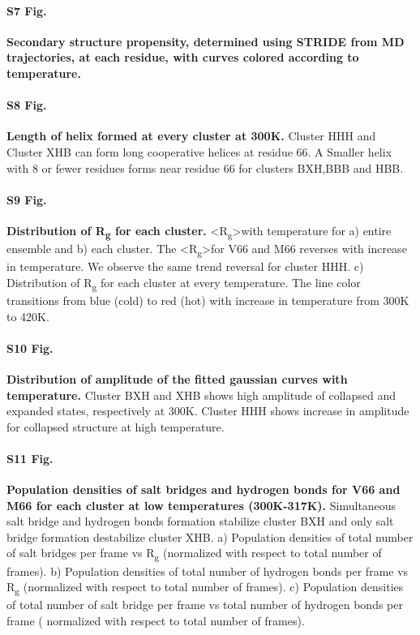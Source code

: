 \documentclass[10pt,letterpaper]{article}
\begin{document}
\paragraph*{S7 Fig.}
\label{S7_Fig} 
{\bf Secondary structure propensity, determined using STRIDE from MD trajectories, at each residue, with curves colored according to temperature.}

\paragraph*{S8 Fig.}
\label{S8_Fig} 
{\bf Length of helix formed at every cluster at 300K.} Cluster HHH and Cluster XHB can form long cooperative helices at residue 66. A Smaller helix with 8 or fewer residues forms near residue 66 for clusters BXH,BBB and HBB.
 
\paragraph*{S9 Fig.}
\label{S9_Fig} 
{\bf Distribution of R\textsubscript{g} for each cluster.}
\textless R\textsubscript{g}\textgreater with temperature for a) entire ensemble and b) each cluster. The \textless R\textsubscript{g}\textgreater for V66 and M66 reverses with increase in temperature. We observe the same trend reversal for cluster HHH. c) Distribution of R\textsubscript{g} for each cluster at every temperature. The line color transitions from blue (cold) to red (hot) with increase in temperature from 300K to 420K. 

\paragraph*{S10 Fig.}
\label{S10_Fig} 
{\bf Distribution of amplitude of the fitted gaussian curves with temperature.}
Cluster BXH and XHB shows high amplitude of collapsed and expanded states, respectively at 300K. Cluster HHH shows increase in amplitude for collapsed structure at high temperature.

\paragraph*{S11 Fig.}
\label{S11_Fig} 
{\bf Population densities of salt bridges and hydrogen bonds for V66 and M66 for each cluster at low temperatures (300K-317K).}
Simultaneous salt bridge and hydrogen bonds formation stabilize cluster BXH and only salt bridge formation destabilize cluster XHB.  a) Population densities of total number of salt bridges per frame vs R\textsubscript{g} (normalized with respect to total number of frames). b) Population densities of total number of hydrogen bonds per frame vs R\textsubscript{g} (normalized with respect to total number of frames). c) Population densities of total number of salt bridge per frame vs total number of hydrogen bonds  per frame ( normalized with respect to total number of frames).
\end{document}
